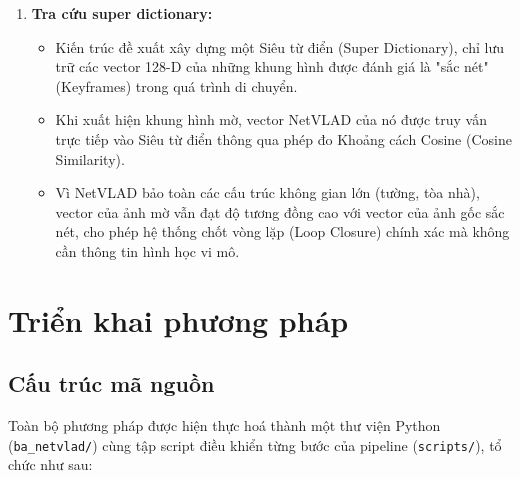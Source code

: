 \documentclass[a4paper,12pt]{article}
\begin{document}
\begin{enumerate}
    \item \textbf{Tra cứu super dictionary:} 
    \begin{itemize}
        \item Kiến trúc đề xuất xây dựng một Siêu từ điển (Super Dictionary), chỉ lưu trữ các vector 128-D của những khung hình được đánh giá là "sắc nét" (Keyframes) trong quá trình di chuyển.
        \item Khi xuất hiện khung hình mờ, vector NetVLAD của nó được truy vấn trực tiếp vào Siêu từ điển thông qua phép đo Khoảng cách Cosine (Cosine Similarity).
        \item Vì NetVLAD bảo toàn các cấu trúc không gian lớn (tường, tòa nhà), vector của ảnh mờ vẫn đạt độ tương đồng cao với vector của ảnh gốc sắc nét, cho phép hệ thống chốt vòng lặp (Loop Closure) chính xác mà không cần thông tin hình học vi mô.
    \end{itemize}
\end{enumerate}



\section{Triển khai phương pháp}

\subsection{Cấu trúc mã nguồn}
Toàn bộ phương pháp được hiện thực hoá thành một thư viện Python (\texttt{ba\_netvlad/}) cùng tập script điều khiển từng bước của pipeline (\texttt{scripts/}), tổ chức như sau:
\end{document}
